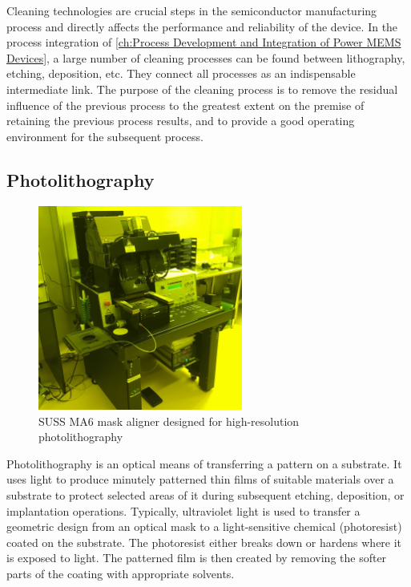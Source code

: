 Cleaning technologies are crucial steps in the semiconductor manufacturing process and directly affects the performance and reliability of the device. In the process integration of \autoref{ch:Process Development and Integration of Power MEMS Devices}, a large number of cleaning processes can be found between lithography, etching, deposition, etc. They connect all processes as an indispensable intermediate link. The purpose of the cleaning process is to remove the residual influence of the previous process to the greatest extent on the premise of retaining the previous process results, and to provide a good operating environment for the subsequent process.

\subsection{Photolithography}

\begin{figure}[H] 
\centering    
\includegraphics[width=0.6\textwidth]{photolithography}
\caption[SUSS MA6 mask aligner designed for high-resolution photolithography]{SUSS MA6 mask aligner designed for high-resolution photolithography}
\label{fig:photolithography}
\end{figure}

Photolithography  is an optical means of transferring a pattern on a  substrate. It uses light to produce minutely patterned  thin films of suitable materials over a substrate to protect selected areas of it during subsequent etching, deposition, or implantation operations. Typically, ultraviolet light is used to transfer a geometric design from an optical mask to a light-sensitive chemical  (photoresist) coated on the substrate. The photoresist either breaks down or hardens where it is exposed to light. The patterned film is then created by removing the softer parts of the coating with appropriate solvents.

